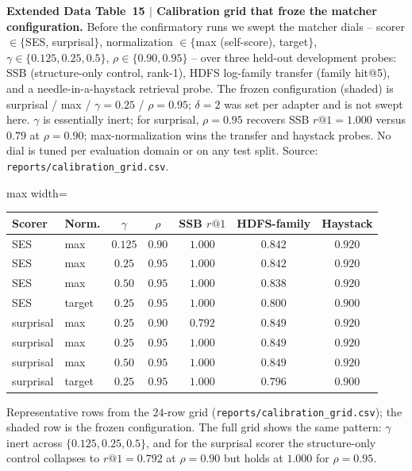\documentclass[pdflatex,sn-nature]{sn-jnl}
\newcommand{\edcaption}[1]{\par{\small #1}\par\smallskip}
\begin{document}
\begin{appendices}
\begin{table}[htbp]
\centering
\edcaption{\textbf{Extended Data Table~15 $|$ Calibration grid that froze the
    matcher configuration.}
  Before the confirmatory runs we swept the matcher dials -- scorer
  $\in\{$SES, surprisal$\}$, normalization $\in\{$max (self-score), target$\}$,
  $\gamma\in\{0.125,0.25,0.5\}$, $\rho\in\{0.90,0.95\}$ -- over three held-out
  development probes: SSB (structure-only control, rank-1), HDFS log-family
  transfer (family hit@5), and a needle-in-a-haystack retrieval probe. The frozen
  configuration (shaded) is surprisal / max / $\gamma{=}0.25$ / $\rho{=}0.95$;
  $\delta{=}2$ was set per adapter and is not swept here. $\gamma$ is essentially
  inert; for surprisal, $\rho{=}0.95$ recovers SSB $r@1{=}1.000$ versus $0.79$ at
  $\rho{=}0.90$; max-normalization wins the transfer and haystack probes. No dial
  is tuned per evaluation domain or on any test split.
  Source: \texttt{reports/calibration\_grid.csv}.}
\scriptsize
\setlength{\tabcolsep}{5pt}
\begin{adjustbox}{max width=\textwidth}
\begin{tabular}{llccccc}
\toprule
\textbf{Scorer} & \textbf{Norm.} & \textbf{$\gamma$} & \textbf{$\rho$} &
    \textbf{SSB $r@1$} & \textbf{HDFS-family} & \textbf{Haystack} \\
\midrule
SES       & max    & $0.125$ & $0.90$ & $1.000$ & $0.842$ & $0.920$ \\
SES       & max    & $0.25$  & $0.95$ & $1.000$ & $0.842$ & $0.920$ \\
SES       & max    & $0.50$  & $0.95$ & $1.000$ & $0.838$ & $0.920$ \\
SES       & target & $0.25$  & $0.95$ & $1.000$ & $0.800$ & $0.900$ \\
surprisal & max    & $0.25$  & $0.90$ & $0.792$ & $0.849$ & $0.920$ \\
\rowcolor{smarow}surprisal & max & $0.25$ & $0.95$ & $\mathbf{1.000}$ & $\mathbf{0.849}$ & $\mathbf{0.920}$ \\
surprisal & max    & $0.50$  & $0.95$ & $1.000$ & $0.849$ & $0.920$ \\
surprisal & target & $0.25$  & $0.95$ & $1.000$ & $0.796$ & $0.900$ \\
\bottomrule
\end{tabular}
\end{adjustbox}
\begin{flushleft}{\footnotesize
Representative rows from the $24$-row grid (\texttt{reports/calibration\_grid.csv});
the shaded row is the frozen configuration. The full grid shows the same pattern:
$\gamma$ inert across $\{0.125,0.25,0.5\}$, and for the surprisal scorer the
structure-only control collapses to $r@1{=}0.792$ at $\rho{=}0.90$ but holds at
$1.000$ for $\rho{=}0.95$.}
\end{flushleft}
\label{tab:ed15_calibration}
\end{table}



\end{appendices}
\end{document}
